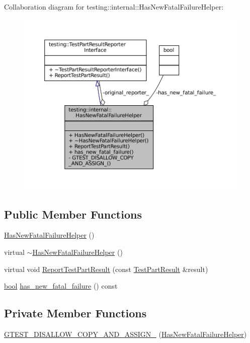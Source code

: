 Collaboration diagram for testing\+:\+:internal\+:\+:Has\+New\+Fatal\+Failure\+Helper\+:
\nopagebreak
\begin{figure}[H]
\begin{center}
\leavevmode
\includegraphics[width=350pt]{classtesting_1_1internal_1_1HasNewFatalFailureHelper__coll__graph}
\end{center}
\end{figure}
\subsection*{Public Member Functions}
\begin{DoxyCompactItemize}
\item 
\hyperlink{classtesting_1_1internal_1_1HasNewFatalFailureHelper_a59190a7188db558c00b4c6bf9251859a}{Has\+New\+Fatal\+Failure\+Helper} ()
\item 
virtual \hyperlink{classtesting_1_1internal_1_1HasNewFatalFailureHelper_a913b1bc7c372868c9b2dbb009044ee97}{$\sim$\+Has\+New\+Fatal\+Failure\+Helper} ()
\item 
virtual void \hyperlink{classtesting_1_1internal_1_1HasNewFatalFailureHelper_a2d2e1faa1f3669b82810df97ac678a27}{Report\+Test\+Part\+Result} (const \hyperlink{classtesting_1_1TestPartResult}{Test\+Part\+Result} \&result)
\item 
\hyperlink{classbool}{bool} \hyperlink{classtesting_1_1internal_1_1HasNewFatalFailureHelper_a91b7bac47f09076db4be0304a2110a9e}{has\+\_\+new\+\_\+fatal\+\_\+failure} () const
\end{DoxyCompactItemize}
\subsection*{Private Member Functions}
\begin{DoxyCompactItemize}
\item 
\hyperlink{classtesting_1_1internal_1_1HasNewFatalFailureHelper_a1412aefd53134f35ce1689f56c35a10d}{G\+T\+E\+S\+T\+\_\+\+D\+I\+S\+A\+L\+L\+O\+W\+\_\+\+C\+O\+P\+Y\+\_\+\+A\+N\+D\+\_\+\+A\+S\+S\+I\+G\+N\+\_\+} (\hyperlink{classtesting_1_1internal_1_1HasNewFatalFailureHelper}{Has\+New\+Fatal\+Failure\+Helper})
\end{DoxyCompactItemize}
